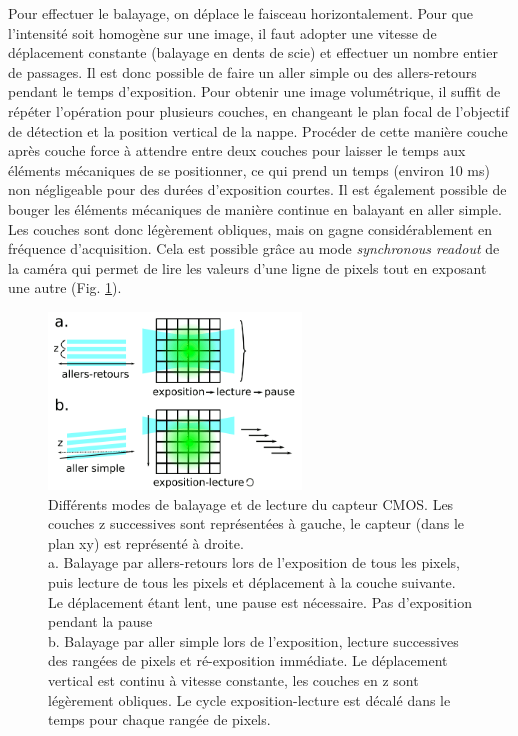 Pour effectuer le balayage, on déplace le faisceau horizontalement. Pour que l'intensité soit homogène sur une image, il faut adopter une vitesse de déplacement constante (balayage en dents de scie) et effectuer un nombre entier de passages. Il est donc possible de faire un aller simple ou des allers-retours pendant le temps d'exposition. Pour obtenir une image volumétrique, il suffit de répéter l'opération pour plusieurs couches, en changeant le plan focal de l'objectif de détection et la position vertical de la nappe. Procéder de cette manière couche après couche force à attendre entre deux couches pour laisser le temps aux éléments mécaniques de se positionner, ce qui prend un temps (environ 10 ms) non négligeable pour des durées d'exposition courtes. Il est également possible de bouger les éléments mécaniques de manière continue en balayant en aller simple. Les couches sont donc légèrement obliques, mais on gagne considérablement en fréquence d'acquisition. Cela est possible grâce au mode \emph{synchronous readout} de la caméra qui permet de lire les valeurs d'une ligne de pixels tout en exposant une autre (Fig. \ref{FIGsynchronousreadout}).


\begin{figure}
    \centering
    \includegraphics[width=0.6\textwidth]{./files/schema_balayage.svg.png}
    \caption{Différents modes de balayage et de lecture du capteur CMOS. Les couches z successives sont représentées à gauche, le capteur (dans le plan xy) est représenté à droite.\\
    a. Balayage par allers-retours lors de l'exposition de tous les pixels, puis lecture de tous les pixels et déplacement à la couche suivante. Le déplacement étant lent, une pause est nécessaire. Pas d'exposition pendant la pause\\
    b. Balayage par aller simple lors de l'exposition, lecture successives des rangées de pixels et ré-exposition immédiate. Le déplacement vertical est continu à vitesse constante, les couches en z sont légèrement obliques. Le cycle exposition-lecture est décalé dans le temps pour chaque rangée de pixels.
    \label{FIGsynchronousreadout}}
    \end{figure}

